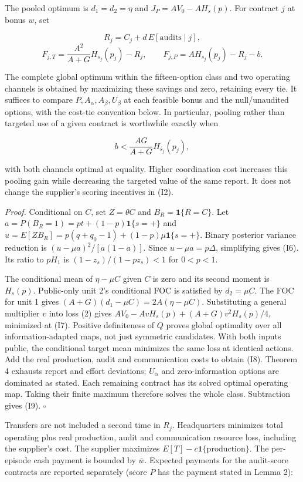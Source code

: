\documentclass[
  11pt,
]{article}
\begin{document}
The pooled optimum is \(d_1=d_2=\eta\) and \(J_P=AV_0-AH_s(p)\). For
contract \(j\) at bonus \(w\), set

\[R_j=C_j+d\,E[\text{audits}\mid j],\]
\[F_{j,T}=\frac{A^2}{A+G}H_{s_j}(p_j)-R_j,\qquad
F_{j,P}=AH_{s_j}(p_j)-R_j-b. \tag{I8}\]

The complete global optimum within the fifteen-option class and two
operating channels is obtained by maximizing these savings and zero,
retaining every tie. It suffices to compare
\(P,A_\alpha,A_\beta,U_\beta\) at each feasible bonus and the
null/unaudited options, with the cost-tie convention below. In
particular, pooling rather than targeted use of a given contract is
worthwhile exactly when

\[b<\frac{AG}{A+G}H_{s_j}(p_j), \tag{I9}\]

with both channels optimal at equality. Higher coordination cost
increases this pooling gain while decreasing the targeted value of the
same report. It does not change the supplier's scoring incentives in
(I2).

\emph{Proof.} Conditional on \(C\), set \(Z=\theta C\) and
\(B_R=\mathbf1\{R=C\}\). Let \(a=P(B_R=1)=pt+(1-p)\mathbf1\{s=+\}\) and
\(u=E[ZB_R]=p(q+q_0-1)+(1-p)\mu\mathbf1\{s=+\}\). Binary posterior
variance reduction is \((u-\mu a)^2/[a(1-a)]\). Since
\(u-\mu a=p\Delta\), simplifying gives (I6). Its ratio to \(pH_1\) is
\((1-z_s)/(1-pz_s)<1\) for \(0<p<1\).

The conditional mean of \(\eta-\mu C\) given \(C\) is zero and its
second moment is \(H_s(p)\). Public-only unit 2's conditional FOC is
satisfied by \(d_2=\mu C\). The FOC for unit 1 gives
\((A+G)(d_1-\mu C)=2A(\eta-\mu C)\). Substituting a general multiplier
\(v\) into loss (2) gives \(AV_0-AvH_s(p)+(A+G)v^2H_s(p)/4\), minimized
at (I7). Positive definiteness of \(Q\) proves global optimality over
all information-adapted maps, not just symmetric candidates. With both
inputs public, the conditional target mean minimizes the same loss at
identical actions. Add the real production, audit and communication
costs to obtain (I8). Theorem 4 exhausts report and effort deviations;
\(U_\alpha\) and zero-information options are dominated as stated. Each
remaining contract has its solved optimal operating map. Taking their
finite maximum therefore solves the whole class. Subtraction gives (I9).
\(\square\)

Transfers are not included a second time in \(R_j\). Headquarters
minimizes total operating plus real production, audit and communication
resource loss, including the supplier's cost. The supplier maximizes
\(E[T]-c\mathbf1\{\text{production}\}\). The per-episode cash payment is
bounded by \(\bar w\). Expected payments for the audit-score contracts
are reported separately (score \(P\) has the payment stated in Lemma 2):
\end{document}
